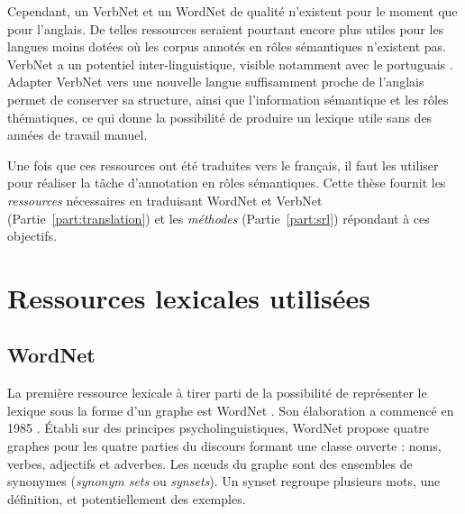 Cependant, un VerbNet et un WordNet de qualité n'existent pour le moment que
pour l'anglais. De telles ressources seraient pourtant encore plus utiles pour
les langues moins dotées où les corpus annotés en rôles sémantiques n'existent
pas. VerbNet a un potentiel inter-linguistique, visible notamment avec le
portuguais \citep[section 2.2.2]{kipperschuler2005verbnet}. Adapter VerbNet
vers une nouvelle langue suffisamment proche de l'anglais permet de conserver
sa structure, ainsi que l'information sémantique et les rôles thématiques, ce
qui donne la possibilité de produire un lexique utile sans des années de
travail manuel.

Une fois que ces ressources ont été traduites vers le français, il faut les
utiliser pour réaliser la tâche d'annotation en rôles sémantiques. Cette thèse
fournit les \textit{ressources} nécessaires en traduisant WordNet et VerbNet
(Partie~\ref{part:translation}) et les \textit{méthodes} (Partie~\ref{part:srl})
répondant à ces objectifs.

\section{Ressources lexicales utilisées}
\label{ressources_utilisees}

\subsection{WordNet}
\label{presentation_wordnet}

La première ressource lexicale à tirer parti de la possibilité de représenter
le lexique sous la forme d'un graphe est WordNet \citep{fellbaum1998wordnet}.
Son élaboration a commencé en 1985 \citep{miller1990introduction}. Établi sur
des principes psycholinguistiques, WordNet propose quatre graphes pour les
quatre parties du discours formant une classe ouverte : noms, verbes,
adjectifs et adverbes. Les nœuds du graphe sont des ensembles de synonymes
(\textit{synonym sets} ou \textit{synsets}). Un synset regroupe plusieurs mots, une
définition, et potentiellement des exemples.

